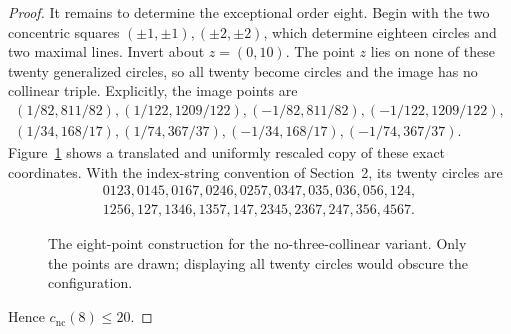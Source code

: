 \documentclass[11pt,a4paper]{article}
\theoremstyle{definition}
\begin{document}
\begin{proof}
It remains to determine the exceptional order eight.  Begin with the two
concentric squares $(\pm1,\pm1),(\pm2,\pm2)$, which determine eighteen
circles and two maximal lines.  Invert about $z=(0,10)$.  The point $z$ lies
on none of these twenty generalized circles, so all twenty become circles and
the image has no collinear triple.  Explicitly, the image points are
\[
\begin{gathered}
(1/82,811/82),(1/122,1209/122),(-1/82,811/82),(-1/122,1209/122),\\
(1/34,168/17),(1/74,367/37),(-1/34,168/17),(-1/74,367/37).
\end{gathered}
\]
Figure~\ref{fig:no-three-eight-en} shows a translated and uniformly rescaled
copy of these exact coordinates.  With the index-string convention of
Section~2, its twenty circles are
\begin{gather*}
0123,0145,0167,0246,0257,0347,035,036,056,124,\\
1256,127,1346,1357,147,2345,2367,247,356,4567.
\end{gather*}
\begin{figure}[ht]
\centering
{}
\caption{The eight-point construction for the no-three-collinear variant.
Only the points are drawn; displaying all twenty circles would obscure the
configuration.}
\label{fig:no-three-eight-en}
\end{figure}
Hence $c_{\mathrm{nc}}(8)\le20$.


\end{proof}
\end{document}
